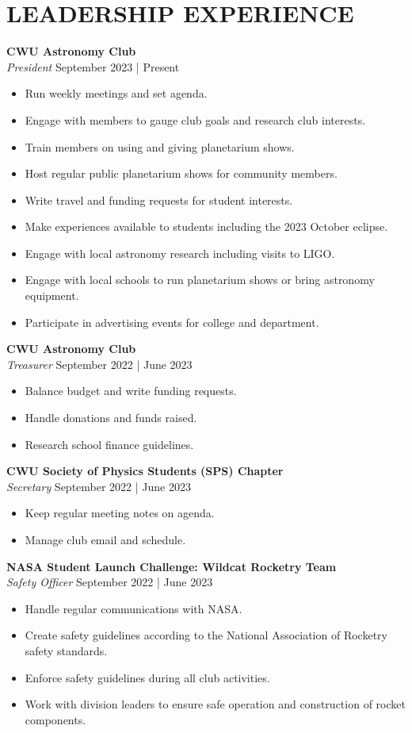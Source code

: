 \documentclass[a4paper,9pt]{extarticle}
\begin{document}
\section*{LEADERSHIP EXPERIENCE}
\noindent\textbf{CWU Astronomy Club}\\
\textit{President} \hfill September 2023 | Present
\begin{itemize}
    \item Run weekly meetings and set agenda.
    \item Engage with members to gauge club goals and research club interests.
    \item Train members on using and giving planetarium shows.
    \item Host regular public planetarium shows for community members.
    \item Write travel and funding requests for student interests.
    \item Make experiences available to students including the 2023 October eclipse.
    \item Engage with local astronomy research including visits to LIGO.
    \item Engage with local schools to run planetarium shows or bring astronomy equipment.
    \item Participate in advertising events for college and department.
\end{itemize}

\noindent\textbf{CWU Astronomy Club}\\
\textit{Treasurer} \hfill September 2022 | June 2023
\begin{itemize}
    \item Balance budget and write funding requests.
    \item Handle donations and funds raised.
    \item Research school finance guidelines.
\end{itemize}

\noindent\textbf{CWU Society of Physics Students (SPS) Chapter}\\
\textit{Secretary} \hfill September 2022 | June 2023
\begin{itemize}
    \item Keep regular meeting notes on agenda.
    \item Manage club email and schedule.
\end{itemize}

\noindent\textbf{NASA Student Launch Challenge: Wildcat Rocketry Team}\\
\textit{Safety Officer} \hfill September 2022 | June 2023
\begin{itemize}
    \item Handle regular communications with NASA.
    \item Create safety guidelines according to the National Association of Rocketry safety standards.
    \item Enforce safety guidelines during all club activities.
    \item Work with division leaders to ensure safe operation and construction of rocket components.
\end{itemize}
\end{document}
